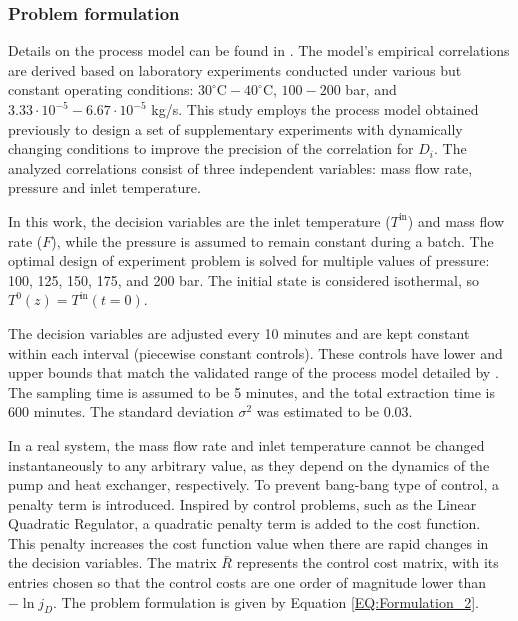 \documentclass[../Article_Design_of_Experiment.tex]{subfiles}
\begin{document}
	\subsubsection{Problem formulation}
	
	Details on the process model can be found in \citet{Sliczniuk2024}. The model's empirical correlations are derived based on laboratory experiments conducted under various but constant operating conditions: $30^\circ\text{C} - 40^\circ\text{C}$, $100 - 200$ bar, and $3.33 \cdot 10^{-5} - 6.67 \cdot 10^{-5}$ kg/s. This study employs the process model obtained previously to design a set of supplementary experiments with dynamically changing conditions to improve the precision of the correlation for $D_i$. The analyzed correlations consist of three independent variables: mass flow rate, pressure and inlet temperature. 
	
	In this work, the decision variables are the inlet temperature ($T^{\text{in}}$) and mass flow rate ($F$), while the pressure is assumed to remain constant during a batch. The optimal design of experiment problem is solved for multiple values of pressure: 100, 125, 150, 175, and 200 bar. The initial state is considered isothermal, so $T^0(z) = T^{\text{in}}(t=0)$.
	
	The decision variables are adjusted every 10 minutes and are kept constant within each interval (piecewise constant controls). These controls have lower and upper bounds that match the validated range of the process model detailed by \citet{Sliczniuk2024}. The sampling time is assumed to be 5 minutes, and the total extraction time is 600 minutes. The standard deviation $\sigma^2$ was estimated to be 0.03.
	
	In a real system, the mass flow rate and inlet temperature cannot be changed instantaneously to any arbitrary value, as they depend on the dynamics of the pump and heat exchanger, respectively. To prevent bang-bang type of control, a penalty term is introduced. Inspired by control problems, such as the Linear Quadratic Regulator, a quadratic penalty term is added to the cost function. This penalty increases the cost function value when there are rapid changes in the decision variables. The matrix $\bar{R}$ represents the control cost matrix, with its entries chosen so that the control costs are one order of magnitude lower than $-\ln j_D$. The problem formulation is given by Equation \ref{EQ:Formulation_2}.
	
\end{document}
